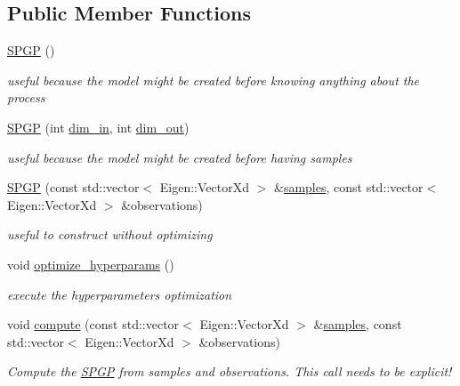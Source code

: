 \subsection*{Public Member Functions}
\begin{DoxyCompactItemize}
\item 
\hyperlink{classlimbo_1_1model_1_1_s_p_g_p_a7052cad1d905c48e673f2a843d2643c9}{S\+P\+GP} ()
\begin{DoxyCompactList}\small\item\em useful because the model might be created before knowing anything about the process \end{DoxyCompactList}\item 
\hyperlink{classlimbo_1_1model_1_1_s_p_g_p_a6fe55238f690cfba7dc1de3e6ad25ac3}{S\+P\+GP} (int \hyperlink{classlimbo_1_1model_1_1_s_p_g_p_ab84d7663a814757766c2d630e0bacd9e}{dim\+\_\+in}, int \hyperlink{classlimbo_1_1model_1_1_s_p_g_p_a605b47cf6ecf50c2436cbad531099d16}{dim\+\_\+out})
\begin{DoxyCompactList}\small\item\em useful because the model might be created before having samples \end{DoxyCompactList}\item 
\hyperlink{classlimbo_1_1model_1_1_s_p_g_p_a9fd5b3f449fd1a17e8699e9771ceae7d}{S\+P\+GP} (const std\+::vector$<$ Eigen\+::\+Vector\+Xd $>$ \&\hyperlink{classlimbo_1_1model_1_1_s_p_g_p_a867505eb41e8fe971eb7de28b2cea50f}{samples}, const std\+::vector$<$ Eigen\+::\+Vector\+Xd $>$ \&observations)
\begin{DoxyCompactList}\small\item\em useful to construct without optimizing \end{DoxyCompactList}\item 
void \hyperlink{classlimbo_1_1model_1_1_s_p_g_p_a942a3f77cffebf2210203da69d2329d4}{optimize\+\_\+hyperparams} ()
\begin{DoxyCompactList}\small\item\em execute the hyperparameters optimization \end{DoxyCompactList}\item 
void \hyperlink{classlimbo_1_1model_1_1_s_p_g_p_a8113b7d23df0d1c2c7d5190a95490e9c}{compute} (const std\+::vector$<$ Eigen\+::\+Vector\+Xd $>$ \&\hyperlink{classlimbo_1_1model_1_1_s_p_g_p_a867505eb41e8fe971eb7de28b2cea50f}{samples}, const std\+::vector$<$ Eigen\+::\+Vector\+Xd $>$ \&observations)
\begin{DoxyCompactList}\small\item\em Compute the \hyperlink{classlimbo_1_1model_1_1_s_p_g_p}{S\+P\+GP} from samples and observations. This call needs to be explicit! \end{DoxyCompactList}\item 

\end{DoxyCompactItemize}
